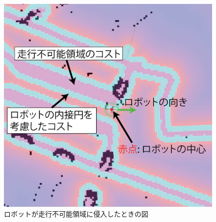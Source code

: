 \begin{figure}[h]
  \begin{center}
  	\includegraphics[width=0.9\linewidth]{figs/mugimaru_result.eps}
  	\caption{ロボットが走行不可能領域に侵入したときの図} 
  	\label{fig:mugimaru_result}
  \end{center}
\end{figure}

